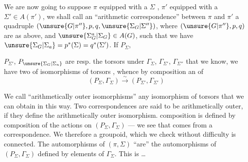 
We are now going to suppose $\pi$ equipped with a $\Sigma$ , $\pi'$ equipped with a $\Sigma'\in A(\pi')$, we shall call an ``arithmetic correspondence'' between $\pi$ and $\pi'$ a quadruple $(\unsure{G|\pi''},p,q,\unsure{\Sigma_G|\Sigma''})$, where $(\unsure{G|\pi''},p,q)$ are as above, and $\unsure{\Sigma_G^{a}|\Sigma_G}\in A(G)$, such that we have $\unsure{\Sigma_G|\Sigma_a}=p^*(\Sigma)=q^*(\Sigma')$.  If $P_{\Sigma}$,


$P_{\Sigma'}$, $P_{\unsure{\Sigma_G|\Sigma_a}}$ are resp. the torsors under $\Gamma_{\Sigma}$, $\Gamma_{\Sigma'}$, $\Gamma_{\Sigma''}$ that we know, we have two  of isomorphisms of torsors
,
whence by composition an  of
\[
(P_{\Sigma},\Gamma_{\Sigma})\xrightarrow{\sim}(P_{\Sigma'},\Gamma_{\Sigma'})
\]

We call ``arithmetically outer isomorphisms''  any isomorphism of torsors that we can obtain in this way. Two correspondences are said to be   arithmetically outer, if they define the  arithmetically outer isomorphism.  composition is defined by composition of the actions on $(P_{\Sigma},\Gamma_{\Sigma})$ --- we see that  comes from a correspondence. We  therefore a groupoid, which we check without difficulty is connected.  The automorphisms of $(\pi,\Sigma)$ ``are'' the automorphisms of $(P_{\Sigma},\Gamma_{\Sigma})$ defined by elements of $\Gamma_{\Sigma}$.  This is \ldots


